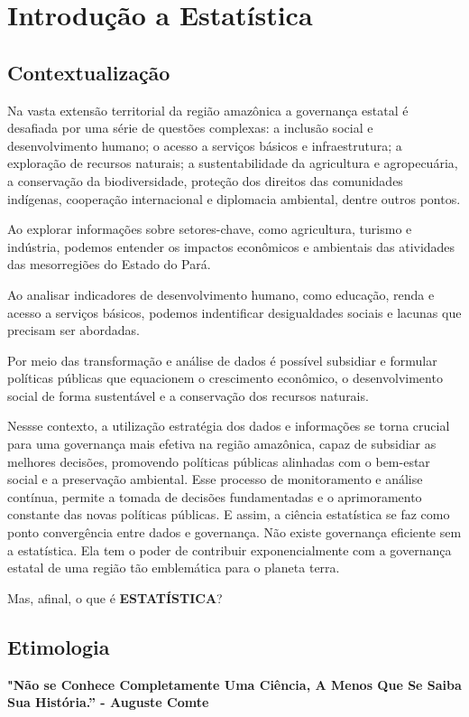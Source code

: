 \chapter{Introdução a Estatística}
\section{Contextualização}

Na vasta extensão territorial da região amazônica a governança estatal é desafiada por uma série de questões complexas: a inclusão social e desenvolvimento humano; o acesso a serviços básicos e infraestrutura; a exploração de recursos naturais; a sustentabilidade da agricultura e agropecuária, a conservação da biodiversidade, proteção dos direitos das comunidades indígenas, cooperação internacional e diplomacia ambiental, dentre outros pontos.\vskip0.3cm

Ao explorar informações sobre setores-chave, como agricultura, turismo e indústria, podemos entender os impactos econômicos e ambientais das atividades das mesorregiões do Estado do Pará.\vskip0.3cm

Ao analisar indicadores de desenvolvimento humano, como educação, renda e acesso a serviços básicos, podemos indentificar desigualdades sociais e lacunas que precisam ser abordadas.\vskip0.3cm

Por meio das transformação e análise de dados é possível subsidiar e formular políticas públicas que equacionem o  crescimento econômico, o desenvolvimento social de forma sustentável e a conservação dos recursos naturais.\vskip0.3cm

Nessse contexto, a utilização estratégia dos dados e informações se torna crucial para uma governança mais efetiva na região amazônica, capaz de subsidiar as melhores decisões, promovendo políticas públicas alinhadas com o bem-estar social e a preservação ambiental. Esse processo de monitoramento e análise contínua, permite a tomada de decisões fundamentadas e o aprimoramento constante das novas políticas públicas. E assim, a ciência estatística se faz como ponto convergência entre dados e governança. Não existe governança eficiente sem a estatística. Ela tem o poder de contribuir exponencialmente com a governança estatal de uma região tão emblemática para o planeta terra.
\vskip0.3cm

Mas, afinal, o que é \textbf{ESTATÍSTICA}?
\vskip0.3cm

\section{Etimologia}
\textbf{"Não se Conhece Completamente Uma Ciência,
A Menos Que Se Saiba Sua História.” - Auguste Comte} \vskip0.3cm

